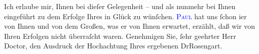 \pstart
           Ich erlaube mir, Ihnen bei dieſer Gelegenheit – und als nunmehr bei Ihnen eingeführt
               zu dem Erfolge Ihres in \label{K_L02798-2v}\label{K_L02798-2h} Glück zu
               wünſchen. \textsc{\textcolor{blue}{Paul}{}\ledrightnote{\textcolor{blue}{Paul Goldmann}}} hat uns ſchon i{\geminationm}er von Ihnen und von dem Großen,
               was er von Ihnen erwartet, erzählt, daß wir von Ihren Erfolgen nicht überraſcht
               waren. Genehmigen Sie, ſehr geehrter Herr Doctor, den Ausdruck der Hochachtung Ihres
               ergebenen\pend
           \pstart \spacefill\mbox{DrRosengart.}\pend{}\endnumbering{}  
      